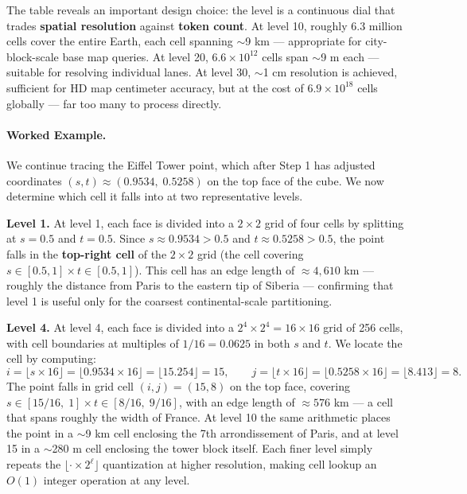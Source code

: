 \documentclass{book}
\begin{document}
The table reveals an important design choice: the level is a
continuous dial that trades \textbf{spatial resolution} against
\textbf{token count}.  At level 10, roughly 6.3 million cells cover
the entire Earth, each cell spanning $\sim$9 km --- appropriate for
city-block-scale base map queries.  At level 20, $6.6 \times 10^{12}$
cells span $\sim$9 m each --- suitable for resolving individual lanes.
At level 30, $\sim$1 cm resolution is achieved, sufficient for HD map
centimeter accuracy, but at the cost of $6.9 \times 10^{18}$ cells
globally --- far too many to process directly. 

\paragraph{Worked Example.}

We continue tracing the Eiffel Tower point, which after Step 1 has
adjusted coordinates $(s, t) \approx (0.9534,\; 0.5258)$ on the top
face of the cube.  We now determine which cell it falls into at two
representative levels.

\medskip
\noindent\textbf{Level 1.}  At level 1, each face is divided into a
$2 \times 2$ grid of four cells by splitting at $s = 0.5$ and
$t = 0.5$.  Since $s \approx 0.9534 > 0.5$ and
$t \approx 0.5258 > 0.5$, the point falls in the \textbf{top-right
cell} of the $2 \times 2$ grid (the cell covering
$s \in [0.5, 1] \times t \in [0.5, 1]$).  This cell has an edge
length of $\approx 4{,}610$ km --- roughly the distance from Paris
to the eastern tip of Siberia --- confirming that level 1 is useful
only for the coarsest continental-scale partitioning.

\medskip
\noindent\textbf{Level 4.}  At level 4, each face is divided into a
$2^4 \times 2^4 = 16 \times 16$ grid of 256 cells, with cell
boundaries at multiples of $1/16 = 0.0625$ in both $s$ and $t$.
We locate the cell by computing:
\[
  i = \lfloor s \times 16 \rfloor = \lfloor 0.9534 \times 16 \rfloor
    = \lfloor 15.254 \rfloor = 15, \qquad
  j = \lfloor t \times 16 \rfloor = \lfloor 0.5258 \times 16 \rfloor
    = \lfloor 8.413 \rfloor = 8.
\]
The point falls in grid cell $(i, j) = (15, 8)$ on the top face,
covering $s \in [15/16,\; 1] \times t \in [8/16,\; 9/16]$, with an
edge length of $\approx 576$ km --- a cell that spans roughly the
width of France.  At level 10 the same arithmetic places the point
in a $\sim$9 km cell enclosing the 7th arrondissement of Paris, and
at level 15 in a $\sim$280 m cell enclosing the tower block itself.
Each finer level simply repeats the $\lfloor \cdot \times 2^\ell
\rfloor$ quantization at higher resolution, making cell lookup an
$O(1)$ integer operation at any level.
\end{document}
